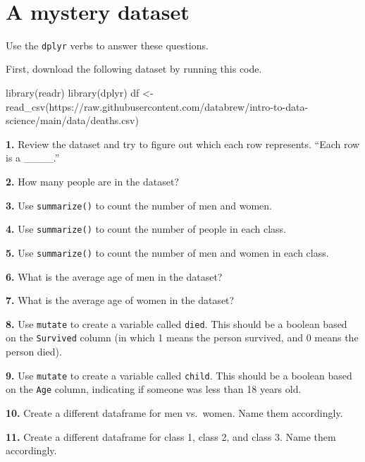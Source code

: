 \documentclass[
]{book}
\newenvironment{Shaded}{\begin{snugshade}}{\end{snugshade}}
\newcommand{\FunctionTok}[1]{\textcolor[rgb]{0.00,0.00,0.00}{#1}}
\newcommand{\NormalTok}[1]{#1}
\newcommand{\OtherTok}[1]{\textcolor[rgb]{0.56,0.35,0.01}{#1}}
\newcommand{\StringTok}[1]{\textcolor[rgb]{0.31,0.60,0.02}{#1}}
\begin{document}
~

\hypertarget{a-mystery-dataset}{%
\chapter{A mystery dataset}\label{a-mystery-dataset}}

Use the \texttt{dplyr} verbs to answer these questions.

First, download the following dataset by running this code.

\begin{Shaded}
\begin{Highlighting}[]
\FunctionTok{library}\NormalTok{(readr)}
\FunctionTok{library}\NormalTok{(dplyr)}
\NormalTok{df }\OtherTok{\textless{}{-}} \FunctionTok{read\_csv}\NormalTok{(}\StringTok{\textquotesingle{}https://raw.githubusercontent.com/databrew/intro{-}to{-}data{-}science/main/data/deaths.csv\textquotesingle{}}\NormalTok{)}
\end{Highlighting}
\end{Shaded}

\textbf{1.} Review the dataset and try to figure out which each row represents. ``Each row is a \_\_\_\_.''

\textbf{2.} How many people are in the dataset?

\textbf{3.} Use \texttt{summarize()} to count the number of men and women.

\textbf{4.} Use \texttt{summarize()} to count the number of people in each class.

\textbf{5.} Use \texttt{summarize()} to count the number of men and women in each class.

\textbf{6.} What is the average age of men in the dataset?

\textbf{7.} What is the average age of women in the dataset?

\textbf{8.} Use \texttt{mutate} to create a variable called \texttt{died}. This should be a boolean based on the \texttt{Survived} column (in which 1 means the person survived, and 0 means the person died).

\textbf{9.} Use \texttt{mutate} to create a variable called \texttt{child}. This should be a boolean based on the \texttt{Age} column, indicating if someone was less than 18 years old.

\textbf{10.} Create a different dataframe for men vs.~women. Name them accordingly.

\textbf{11.} Create a different dataframe for class 1, class 2, and class 3. Name them accordingly.
\end{document}
